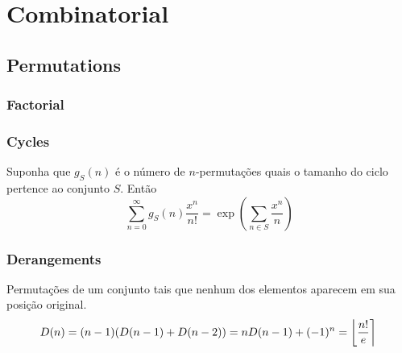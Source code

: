 \newcommand*{\Comb}[2]{{}^{#1}C_{#2}}%
\newcommand{\stirlingfirst}[2]{\genfrac{[}{]}{0pt}{}{#1}{#2}}
\newcommand{\stirlingsecond}[2]{\genfrac{\{}{\}}{0pt}{}{#1}{#2}}

\chapter{Combinatorial}

\section{Permutations}
	\subsection{Factorial}
		


\subsection{Cycles}
		Suponha que $g_S(n)$ é o número de $n$-permutações quais o tamanho do ciclo pertence ao conjunto $S$. Então
		\small
		$$\sum_{n=0} ^\infty g_S(n) \frac{x^n}{n!} = \exp\left(\sum_{n\in S} \frac{x^n} {n} \right)$$
		\normalsize

\subsection{Derangements}
		Permutações de um conjunto tais que nenhum dos elementos aparecem em sua posição original.
		\small
		\[ \mkern-2mu D(n) = (n-1)(D(n-1)+D(n-2)) = n D(n-1)+(-1)^n = \left\lfloor\frac{n!}{e}\right\rceil \]
		\normalsize

	
